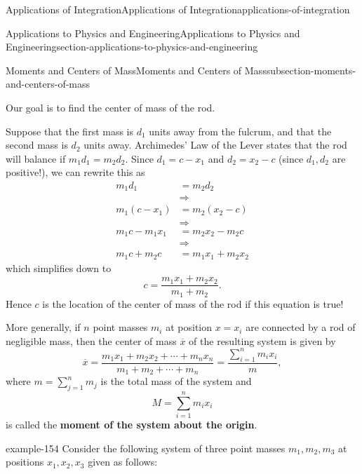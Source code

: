 \documentclass[oneside,10pt,]{book}
\newcommand{\terminology}[1]{\textbf{#1}}
\numberwithin{equation}{section}
\newcommand{\amp}{&}
\begin{document}
\begin{chapterptx}{Applications of Integration}{}{Applications of Integration}{}{}{applications-of-integration}
\begin{sectionptx}{Applications to Physics and Engineering}{}{Applications to Physics and Engineering}{}{}{section-applications-to-physics-and-engineering}
\begin{subsectionptx}{Moments and Centers of Mass}{}{Moments and Centers of Mass}{}{}{subsection-moments-and-centers-of-mass}
\begin{figure}
{
}
\end{figure}
\hypertarget{p-689}{}%
Our goal is to find the center of mass of the rod.%
\par
\hypertarget{p-690}{}%
Suppose that the first mass is \(d_{1}\) units away from the fulcrum, and that the second mass is \(d_{2}\) units away. Archimedes' Law of the Lever states that the rod will balance if \(m_{1}d_{1} = m_{2}d_{2}\). Since \(d_{1} = c - x_{1}\) and \(d_{2} = x_{2} - c\) (since \(d_{1},d_{2}\) are positive!), we can rewrite this as%
\begin{align*}
m_{1}d_{1} \amp= m_{2}d_{2}\\
\amp\Rightarrow\\
m_{1}(c-x_{1}) \amp= m_{2}(x_{2}-c)\\
\amp\Rightarrow\\
m_{1}c-m_{1}x_{1} \amp= m_{2}x_{2} - m_{2}c\\
\amp\Rightarrow\\
m_{1}c+m_{2}c \amp= m_{1}x_{1}+m_{2}x_{2}
\end{align*}
which simplifies down to%
\begin{equation*}
c = \frac{m_{1}x_{1}+m_{2}x_{2}}{m_{1}+m_{2}}.
\end{equation*}
Hence \(c\) is the location of the center of mass of the rod if this equation is true!%
\par
\hypertarget{p-691}{}%
More generally, if \(n\) point masses \(m_{i}\) at position \(x=x_{i}\) are connected by a rod of negligible mass, then the center of mass \(\overline{x}\) of the resulting system is given by%
\begin{equation*}
\overline{x} = \frac{m_{1}x_{1}+m_{2}x_{2}+\cdots+m_{n}x_{n}}{m_{1}+m_{2}+\cdots+m_{n}} = \frac{\sum_{i=1}^{n}m_{i}x_{i}}{m},
\end{equation*}
where \(m = \sum_{j=1}^{n}m_{j}\) is the total mass of the system and%
\begin{equation*}
M = \sum_{i=1}^{n}m_{i}x_{i}
\end{equation*}
is called the \terminology{moment of the system about the origin}.%
\begin{example}{}{example-154}%
\hypertarget{p-692}{}%
Consider the following system of three point masses \(m_{1},m_{2},m_{3}\) at positions \(x_{1},x_{2},x_{3}\) given as follows:%
\par
\hypertarget{p-693}{}%

\end{example}
\end{subsectionptx}
\end{sectionptx}
\end{chapterptx}
\end{document}
